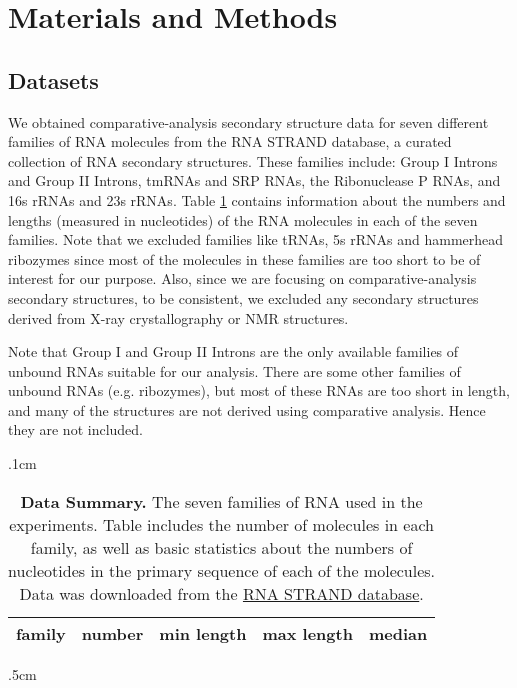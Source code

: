 \documentclass[10pt,letterpaper]{article}
\begin{document}
\section*{Materials and Methods}
\subsection*{Datasets}

We obtained comparative-analysis secondary structure data for seven different families of RNA molecules from the RNA STRAND database\cite{Andronescu2008-rj}, a curated collection of RNA secondary structures. These families include: Group I Introns and Group II Introns\cite{Cannone2002-tp}, tmRNAs and SRP RNAs\cite{Andersen2006-uh}, the Ribonuclease P RNAs\cite{Brown1999-co}, and 16s rRNAs and 23s rRNAs\cite{Cannone2002-tp}. Table \ref{table:lengths} contains information about the numbers and lengths (measured in nucleotides) of the RNA molecules in each of the seven families. Note that we excluded families like tRNAs, 5s rRNAs and hammerhead ribozymes since most of the molecules in these families are too short to be of interest for our purpose. Also, since we are focusing on comparative-analysis secondary structures, to be consistent, we excluded any secondary structures derived from X-ray crystallography or NMR structures.

Note that Group I and Group II Introns are the only available families of unbound RNAs suitable for our analysis. There are some other families of unbound RNAs (e.g. ribozymes), but most of these RNAs are too short in length, and many of the structures are not derived using comparative analysis. Hence they are not included.

\vglue .1cm
\begin{table}[h!]
\begin{center}
\begin{tabular}{ l || r | r | r| r}
\hglue 5mm {\bf family} & {\bf number} & {\bf min length} & {\bf max length} & {\bf median} \\ \hline \hline

\end{tabular}
\vglue .5cm
\caption{\footnotesize {\bf Data Summary.} The seven families of RNA used in the experiments. Table includes the number of molecules in each family, as well as basic statistics about the numbers of nucleotides in the primary sequence of each of the molecules. Data was downloaded from the \href{http://www.rnasoft.ca/strand/}{RNA STRAND database}.}
\label{table:lengths}
\end{center}
\end{table}
\end{document}
